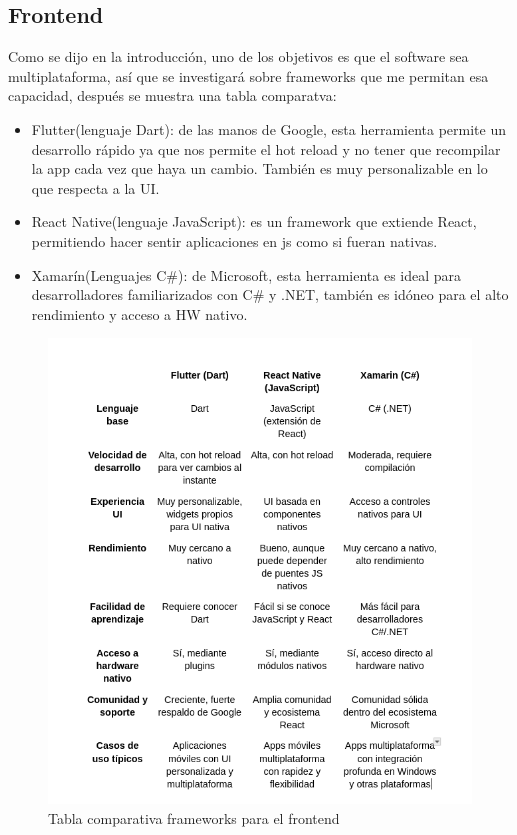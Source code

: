 \subsection{Frontend}

Como se dijo en la introducción, uno de los objetivos es que el software sea multiplataforma, así que se investigará sobre frameworks que me permitan esa capacidad, después se muestra una tabla comparatva:

\begin{itemize}
	\item Flutter(lenguaje Dart): de las manos de Google, esta herramienta permite un desarrollo rápido ya que nos permite el hot reload y no tener que recompilar la app cada vez que haya un cambio. También es muy personalizable en lo que respecta a la UI.
	\item React Native(lenguaje JavaScript): es un framework que extiende React, permitiendo hacer sentir aplicaciones en js como si fueran nativas.
	\item Xamarín(Lenguajes C\#): de Microsoft, esta herramienta es ideal para desarrolladores familiarizados con C\# y .NET, también es idóneo para el alto rendimiento y acceso a HW nativo.
\end{itemize}

\begin{figure}[H]
   \centering
    \includegraphics[width=\textwidth]{tablas/Frontend.png}
    \caption{Tabla comparativa frameworks para el frontend}
    \label{fig:Tabla frontend}
\end{figure} 